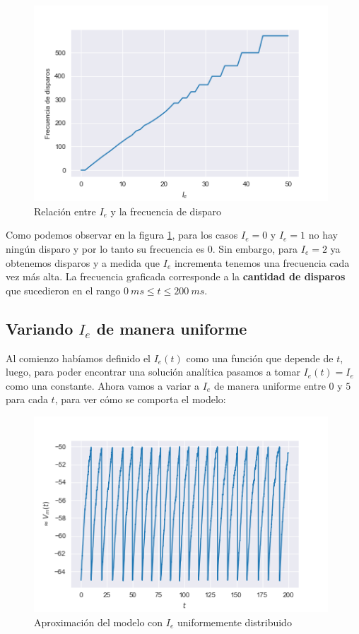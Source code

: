 \documentclass [a4paper,12pt,oneside,final]{article}
\begin{document}
\begin{figure}[ht]
  \centering
  \includegraphics[width=11cm,keepaspectratio]{./diagramas/grafico_c.png}
  \caption{Relación entre $I_e$ y la frecuencia de disparo}\label{fig:c}
\end{figure}

Como podemos observar en la figura \ref{fig:c}, para los casos $I_e = 0$ y $I_e = 1$ no hay ningún disparo y por lo tanto su frecuencia es 0. Sin embargo, para $I_e = 2$ ya obtenemos disparos y a medida que $I_e$ incrementa tenemos una frecuencia cada vez más alta. La frecuencia graficada corresponde a la {\bf cantidad de disparos} que sucedieron en el rango $ 0 \ ms \leq t \leq 200 \ ms$.

\subsection{Variando $I_e$ de manera uniforme}

Al comienzo habíamos definido el $I_e(t)$ como una función que depende de $t$, luego, para poder encontrar una solución analítica pasamos a tomar $I_e(t) = I_e$ como una constante. Ahora vamos a variar a $I_e$ de manera uniforme entre $0$ y $5$ para cada $t$, para ver cómo se comporta el modelo:

\begin{figure}[ht]
  \centering
  \includegraphics[width=11cm,keepaspectratio]{./diagramas/grafico_d.png}
  \caption{Aproximación del modelo con $I_e$ uniformemente distribuido}\label{fig:d}
\end{figure}
\end{document}
